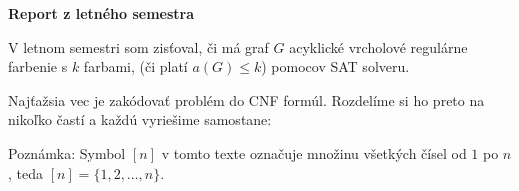 \documentclass[11pt]{article}
\begin{document}
\begin{center}
{\Large\textbf{Report z letného semestra}}
\end{center}

V letnom semestri som zisťoval, či má graf $G$ acyklické vrcholové regulárne farbenie s $k$ farbami, (či platí $a(G) \leq k$) pomocov SAT solveru.

Najťažsia vec je zakódovať problém do CNF formúl. Rozdelíme si ho preto na nikoľko častí a každú vyriešime samostane:

Poznámka: Symbol $[n]$ v tomto texte označuje množinu všetkých čísel od $1$ po $n$, teda $[n] = \{1, 2, \ldots, n\}$.
\end{document}
